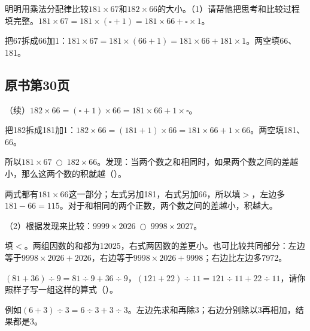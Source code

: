 明明用乘法分配律比较\(181\times67\)和\(182\times66\)的大小。（1）请帮他把思考和比较过程填完整。\(181\times67=181\times(\square+1)=181\times66+\square\times1\)。\par
\begin{BookAnswer}
把67拆成66加1：\(181\times67=181\times(66+1)=181\times66+181\times1\)。两空填66、181。
\end{BookAnswer}



\subsection*{原书第30页}

（续）\(182\times66=(\square+1)\times66=181\times66+1\times\square\)。\par
\begin{BookAnswer}
把182拆成181加1：\(182\times66=(181+1)\times66=181\times66+1\times66\)。两空填181、66。
\end{BookAnswer}

所以\(181\times67\ \bigcirc\ 182\times66\)。发现：当两个数之和相同时，如果两个数之间的差越小，那么这两个数的积就越（\hspace{1.8em}）。\par
\begin{BookAnswer}
两式都有\(181\times66\)这一部分；左式另加181，右式另加66，所以填\(>\)，左边多\(181-66=115\)。对于和相同的两个正数，两个数之间的差越小，积越大。
\end{BookAnswer}

（2）根据发现来比较：\(9999\times2026\ \bigcirc\ 9998\times2027\)。\par
\begin{BookAnswer}
填\(<\)。两组因数的和都为12025，右式两因数的差更小。也可比较共同部分：左边等于\(9998\times2026+2026\)，右边等于\(9998\times2026+9998\)；右边比左边多7972。
\end{BookAnswer}

\((81+36)\div9=81\div9+36\div9\)，\allowbreak{}\((121+22)\div11=121\div11+22\div11\)，请你照样子写一组这样的算式（\hspace{1.8em}）。\par
\begin{BookAnswer}
例如\((6+3)\div3=6\div3+3\div3\)。左边先求和再除3；右边分别除以3再相加，结果都是3。
\end{BookAnswer}

